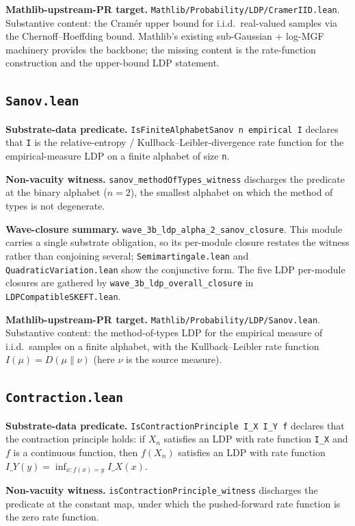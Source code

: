 \documentclass[11pt]{article}
\begin{document}
\textbf{Mathlib-upstream-PR target.}
\texttt{Mathlib/Probability/LDP/CramerIID.lean}.
Substantive content: the Cram\'er upper bound for i.i.d.\
real-valued samples via the Chernoff--Hoeffding bound. Mathlib's
existing sub-Gaussian + log-MGF machinery provides the backbone;
the missing content is the rate-function construction and the
upper-bound LDP statement.

\subsection{\texttt{Sanov.lean}}

\textbf{Substrate-data predicate.}
\texttt{IsFiniteAlphabetSanov n empirical I} declares that
\texttt{I} is the relative-entropy / Kullback--Leibler-divergence
rate function for the empirical-measure LDP on a finite alphabet
of size \texttt{n}.

\textbf{Non-vacuity witness.}
\texttt{sanov\_methodOfTypes\_witness} discharges the predicate at the binary alphabet ($n = 2$), the smallest alphabet on which the method of types is not degenerate.

\textbf{Wave-closure summary.}
\texttt{wave\_3b\_ldp\_alpha\_2\_sanov\_closure}. This module carries a single substrate obligation, so
its per-module closure restates the witness rather than conjoining
several; \texttt{Semimartingale.lean} and
\texttt{QuadraticVariation.lean} show the conjunctive form. The five
LDP per-module closures are gathered by
\texttt{wave\_3b\_ldp\_overall\_closure} in
\texttt{LDPCompatibleSKEFT.lean}.

\textbf{Mathlib-upstream-PR target.}
\texttt{Mathlib/Probability/LDP/Sanov.lean}.
Substantive content: the method-of-types LDP for the empirical
measure of i.i.d.\ samples on a finite alphabet, with the
Kullback--Leibler rate function $I(\mu) = D(\mu \| \nu)$
(here $\nu$ is the source measure).

\subsection{\texttt{Contraction.lean}}

\textbf{Substrate-data predicate.}
\texttt{IsContractionPrinciple I\_X I\_Y f} declares that the
contraction principle holds: if $X_n$ satisfies an LDP with rate
function \texttt{I\_X} and $f$ is a continuous function, then
$f(X_n)$ satisfies an LDP with rate function
$I\_Y(y) = \inf_{x: f(x) = y} I\_X(x)$.

\textbf{Non-vacuity witness.}
\texttt{isContractionPrinciple\_witness} discharges the predicate at the constant map, under which the pushed-forward rate function is the zero rate function.
\end{document}
